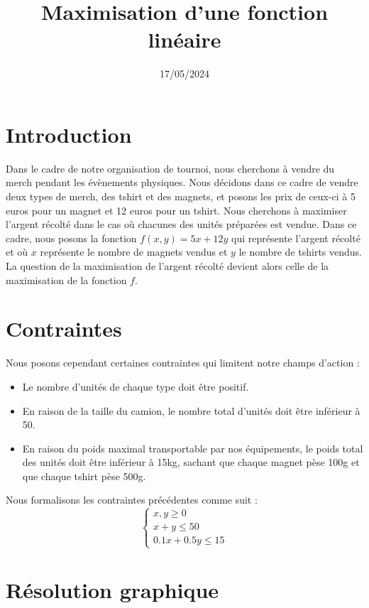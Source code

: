 \documentclass[
]{article}
\title{Maximisation d'une fonction linéaire}
\author{}
\date{\vspace{-2.5em}17/05/2024}
\begin{document}
\maketitle

\section{Introduction}\label{introduction}

Dans le cadre de notre organisation de tournoi, nous cherchons à vendre
du merch pendant les évènements physiques. Nous décidons dans ce cadre
de vendre deux types de merch, des tshirt et des magnets, et posons les
prix de ceux-ci à 5 euros pour un magnet et 12 euros pour un tshirt.
Nous cherchons à maximiser l'argent récolté dans le cas où chacunes des
unités préparées est vendue. Dans ce cadre, nous posons la fonction
\(f(x, y) = 5x + 12y\) qui représente l'argent récolté et où \(x\)
représente le nombre de magnets vendus et \(y\) le nombre de tshirts
vendus. La question de la maximisation de l'argent récolté devient alors
celle de la maximisation de la fonction \(f\).

\section{Contraintes}\label{contraintes}

Nous posons cependant certaines contraintes qui limitent notre champs
d'action :

\begin{itemize}
\item
  Le nombre d'unités de chaque type doit être positif.
\item
  En raison de la taille du camion, le nombre total d'unités doit être
  inférieur à 50.
\item
  En raison du poids maximal transportable par nos équipements, le poids
  total des unités doit être inférieur à 15kg, sachant que chaque magnet
  pèse 100g et que chaque tshirt pèse 500g.
\end{itemize}

Nous formalisons les contraintes précédentes comme suit : \[
\begin{cases}
x,y\geq 0\\
x + y \leq 50 \\
0.1x + 0.5y \leq 15
\end{cases}
\]

\section{Résolution graphique}\label{ruxe9solution-graphique}
\end{document}
